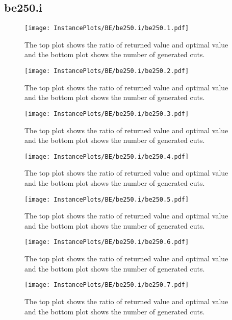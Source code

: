 \documentclass[10pt,a4paper]{article}
\begin{document}
\subsection{be250.i}
\begin{figure}[H]
\texttt{[image: InstancePlots/BE/be250.i/be250.1.pdf]}
\caption{The top plot shows the ratio of returned value and optimal value     and the bottom plot shows the number of generated cuts.}
\end{figure}

\begin{figure}[H]
\texttt{[image: InstancePlots/BE/be250.i/be250.2.pdf]}
\caption{The top plot shows the ratio of returned value and optimal value     and the bottom plot shows the number of generated cuts.}
\end{figure}

\begin{figure}[H]
\texttt{[image: InstancePlots/BE/be250.i/be250.3.pdf]}
\caption{The top plot shows the ratio of returned value and optimal value     and the bottom plot shows the number of generated cuts.}
\end{figure}

\begin{figure}[H]
\texttt{[image: InstancePlots/BE/be250.i/be250.4.pdf]}
\caption{The top plot shows the ratio of returned value and optimal value     and the bottom plot shows the number of generated cuts.}
\end{figure}

\begin{figure}[H]
\texttt{[image: InstancePlots/BE/be250.i/be250.5.pdf]}
\caption{The top plot shows the ratio of returned value and optimal value     and the bottom plot shows the number of generated cuts.}
\end{figure}

\begin{figure}[H]
\texttt{[image: InstancePlots/BE/be250.i/be250.6.pdf]}
\caption{The top plot shows the ratio of returned value and optimal value     and the bottom plot shows the number of generated cuts.}
\end{figure}

\begin{figure}[H]
\texttt{[image: InstancePlots/BE/be250.i/be250.7.pdf]}
\caption{The top plot shows the ratio of returned value and optimal value     and the bottom plot shows the number of generated cuts.}
\end{figure}
\end{document}
